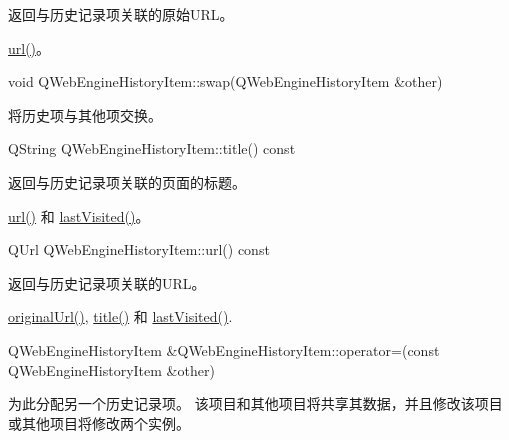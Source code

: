 返回与历史记录项关联的原始URL。

\begin{notice}[另请参阅]
\href{https://github.com/QtDocumentCN/QtDocumentCN/blob/master/Src/W/QWebEngineHistoryItem/qwebenginehistoryitem.html#url}{url()}。
\end{notice}

void QWebEngineHistoryItem::swap(QWebEngineHistoryItem \&other)

将历史项与其他项交换。

QString QWebEngineHistoryItem::title() const

返回与历史记录项关联的页面的标题。

\begin{notice}[另请参阅]
\href{https://github.com/QtDocumentCN/QtDocumentCN/blob/master/Src/W/QWebEngineHistoryItem/qwebenginehistoryitem.html#url}{url()} 和 \href{https://github.com/QtDocumentCN/QtDocumentCN/blob/master/Src/W/QWebEngineHistoryItem/qwebenginehistoryitem.html#lastVisited}{lastVisited()}。
\end{notice}

QUrl QWebEngineHistoryItem::url() const

返回与历史记录项关联的URL。

\begin{notice}[另请参阅]
\href{https://github.com/QtDocumentCN/QtDocumentCN/blob/master/Src/W/QWebEngineHistoryItem/qwebenginehistoryitem.html#originalUrl}{originalUrl()}, \href{https://github.com/QtDocumentCN/QtDocumentCN/blob/master/Src/W/QWebEngineHistoryItem/qwebenginehistoryitem.html#title}{title()} 和 \href{https://github.com/QtDocumentCN/QtDocumentCN/blob/master/Src/W/QWebEngineHistoryItem/qwebenginehistoryitem.html#lastVisited}{lastVisited()}.
\end{notice}

	
QWebEngineHistoryItem \&QWebEngineHistoryItem::operator=(const QWebEngineHistoryItem \&other)


为此分配另一个历史记录项。 该项目和其他项目将共享其数据，并且修改该项目或其他项目将修改两个实例。

